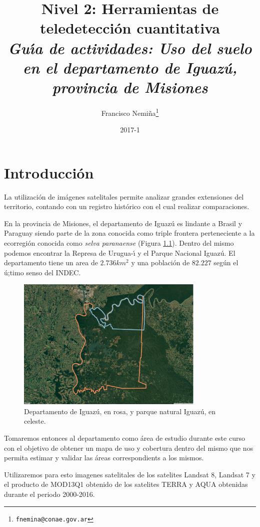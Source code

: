\documentclass[a4paper]{book}
\title{{Nivel 2: Herramientas de teledetecci\'on cuantitativa}\\
\emph{Gu\'{\i}a de actividades: Uso del suelo en el departamento de Iguaz\'u,
provincia de Misiones}}
\date{2017-1}
\author{Francisco Nemiña\thanks{\texttt{fnemina@conae.gov.ar}}}
\affil{Unidad de Educacion y Formacion Masiva \\ Comisi\'on Nacional de Actividades Espaciales}
\begin{document}
\frontmatter
\maketitle

\tableofcontents
\mainmatter
\chapter{Introducción}

\label{sec:intro}

La utilización de imágenes satelitales permite analizar grandes extensiones del
territorio, contando con un registro histórico con el cual realizar
comparaciones.

En la provincia de Misiones, el departamento de Iguaz\'u es lindante a Brasil y
Paraguay siendo parte de la zona conocida como triple frontera
perteneciente a la ecorregi\'on conocida como \emph{selva paranaense} (Figura \ref{parque}). Dentro
del mismo podemos encontrar la Represa de Urugua-\'{\i} y el Parque Nacional
Iguaz\'u. El departamento tiene un area de $2.736 km^2$ y una poblaci\'on de
$82.227$ seg\'un el \'u;timo senso del INDEC.

\begin{figure}[h!]
  \centering
  \includegraphics[width=0.8\textwidth]{triple.png}
  \caption{Departamento de Iguaz\'u, en rosa, y parque natural Iguaz\'u, en celeste.}
  \label{parque}
\end{figure}

Tomaremos entonces al departamento como \'area de estudio durante este curso
con el objetivo de obtener un mapa de uso y cobertura dentro del mismo que nos
permita estimar y validar  las \'areas correspondients a los mismos.

Utilizaremos para esto imagenes satelitales de los satelites Landsat 8, Landsat 7 y
el producto de MOD13Q1 obtenido de los satelites TERRA y AQUA obtenidas durante
el periodo 2000-2016.
\end{document}
